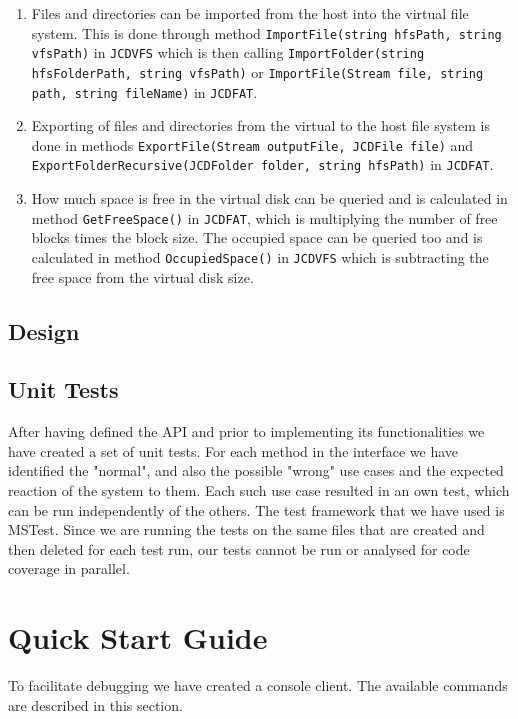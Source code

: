 \documentclass[11pt]{article}
\begin{document}
\begin{enumerate}
	\item Files and directories can be imported from the host into the virtual file system. This is done through method \texttt{ImportFile(string hfsPath, string vfsPath)} in \texttt{JCDVFS} which is then calling \texttt{ImportFolder(string hfsFolderPath, string vfsPath)} or \texttt{ImportFile(Stream file, string path, string fileName)} in \texttt{JCDFAT}.
	\item Exporting of files and directories from the virtual to the host file system is done in methods \texttt{ExportFile(Stream outputFile, JCDFile file)} and \texttt{ExportFolderRecursive(JCDFolder folder, string hfsPath)} in \texttt{JCDFAT}.
	\item How much space is free in the virtual disk can be queried and is calculated in method \texttt{GetFreeSpace()} in \texttt{JCDFAT}, which is multiplying the number of free blocks times the block size. The occupied space can be queried too and is calculated in method \texttt{OccupiedSpace()} in \texttt{JCDVFS} which is subtracting the free space from the virtual disk size.
\end{enumerate}

\subsection{Design}

\subsection{Unit Tests}
After having defined the API and prior to implementing its functionalities we have created a set of unit tests. For each method in the interface we have identified the "normal", and also the possible "wrong" use cases and the expected reaction of the system to them. Each such use case resulted in an own test, which can be run independently of the others. The test framework that we have used is MSTest.\newline
Since we are running the tests on the same files that are created and then deleted for each test run, our tests cannot be run or analysed for code coverage in parallel. 


\setcounter{section}{4}

\section{Quick Start Guide}
To facilitate debugging we have created a console client. The available commands are described in this section.
\end{document}
